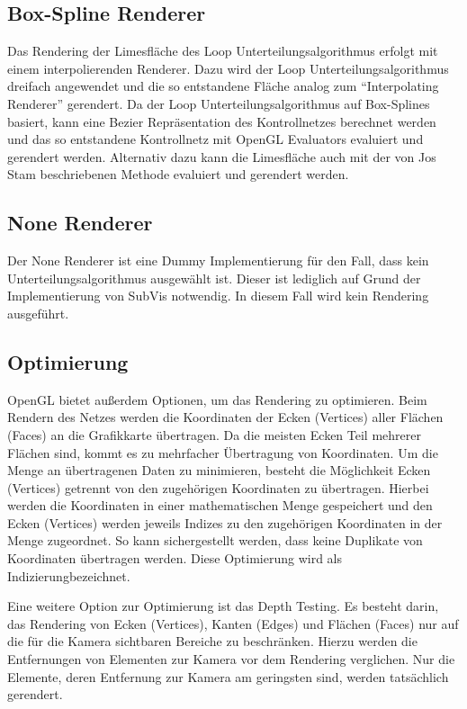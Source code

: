 \subsection{Box-Spline Renderer}
Das Rendering der Limesfläche des Loop Unterteilungsalgorithmus erfolgt mit einem interpolierenden Renderer.
Dazu wird der Loop Unterteilungsalgorithmus dreifach angewendet und die so entstandene Fläche analog zum \enquote{Interpolating Renderer} gerendert.
Da der Loop Unterteilungsalgorithmus auf Box-Splines basiert, kann eine Bezier Repräsentation des Kontrollnetzes berechnet werden \cite{prautzsch:2012} und das so entstandene Kontrollnetz mit OpenGL Evaluators evaluiert und gerendert werden.
Alternativ dazu kann die Limesfläche auch mit der von Jos Stam beschriebenen Methode \cite{JosStam.24.07.2015} evaluiert und gerendert werden.

\subsection{None Renderer}
Der None Renderer ist eine Dummy Implementierung für den Fall, dass kein Unterteilungsalgorithmus ausgewählt ist.
Dieser ist lediglich auf Grund der Implementierung von SubVis notwendig. In diesem Fall wird kein Rendering ausgeführt.

\subsection{Optimierung}
OpenGL bietet außerdem Optionen, um das Rendering zu optimieren. Beim Rendern des Netzes werden die Koordinaten der Ecken (Vertices) aller Flächen (Faces) an die Grafikkarte übertragen. Da die meisten Ecken Teil mehrerer Flächen sind, kommt es zu mehrfacher Übertragung von Koordinaten. Um die Menge an übertragenen Daten zu minimieren, besteht die Möglichkeit Ecken (Vertices) getrennt von den zugehörigen Koordinaten zu übertragen. Hierbei werden die Koordinaten in einer mathematischen Menge gespeichert und den Ecken (Vertices) werden jeweils Indizes zu den zugehörigen Koordinaten in der Menge zugeordnet. So kann sichergestellt werden, dass keine Duplikate von Koordinaten übertragen werden. Diese Optimierung wird als \glqq Indizierung\grqq bezeichnet.

Eine weitere Option zur Optimierung ist das \glqq Depth Testing\grqq. Es besteht darin, das Rendering von Ecken (Vertices), Kanten (Edges) und Flächen (Faces) nur auf die für die Kamera sichtbaren Bereiche zu beschränken. Hierzu werden die Entfernungen von Elementen zur Kamera vor dem Rendering verglichen. Nur die Elemente, deren Entfernung zur Kamera am geringsten sind, werden tatsächlich gerendert.

